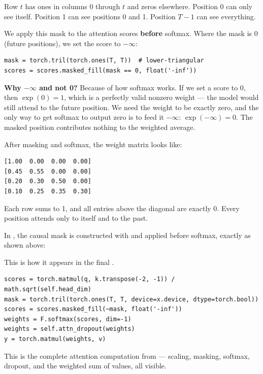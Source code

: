 Row $t$ has ones in columns 0 through $t$ and zeros elsewhere. Position 0 can only see itself. Position 1 can see positions 0 and 1. Position $T-1$ can see everything.

We apply this mask to the attention scores \textbf{before} softmax. Where the mask is 0 (future positions), we set the score to $-\infty$:

\demotag
\begin{lstlisting}
mask = torch.tril(torch.ones(T, T))  # lower-triangular
scores = scores.masked_fill(mask == 0, float('-inf'))
\end{lstlisting}

\textbf{Why $-\infty$ and not 0?} Because of how softmax works. If we set a score to 0, then $\exp(0) = 1$, which is a perfectly valid nonzero weight --- the model would still attend to the future position. We need the weight to be exactly zero, and the only way to get softmax to output zero is to feed it $-\infty$: $\exp(-\infty) = 0$. The masked position contributes nothing to the weighted average.

After masking and softmax, the weight matrix looks like:

\outputtag
\begin{lstlisting}[language={}]
[1.00  0.00  0.00  0.00]
[0.45  0.55  0.00  0.00]
[0.20  0.30  0.50  0.00]
[0.10  0.25  0.35  0.30]
\end{lstlisting}

Each row sums to 1, and all entries above the diagonal are exactly 0. Every position attends only to itself and to the past.

In , the causal mask is constructed with  and applied before softmax, exactly as shown above:

This is how it appears in the final .

\concepttag
\begin{lstlisting}
scores = torch.matmul(q, k.transpose(-2, -1)) / math.sqrt(self.head_dim)
mask = torch.tril(torch.ones(T, T, device=x.device, dtype=torch.bool))
scores = scores.masked_fill(~mask, float('-inf'))
weights = F.softmax(scores, dim=-1)
weights = self.attn_dropout(weights)
y = torch.matmul(weights, v)
\end{lstlisting}

This is the complete attention computation from  --- scaling, masking, softmax, dropout, and the weighted sum of values, all visible.

